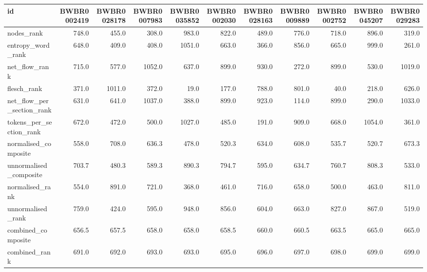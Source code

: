 \begin{tabular}{lrrrrrrrrrr}
\toprule
id & BWBR0002419 & BWBR0028178 & BWBR0007983 & BWBR0035852 & BWBR0002030 & BWBR0028163 & BWBR0009889 & BWBR0002752 & BWBR0045207 & BWBR0029283 \\
\midrule
nodes\_rank & 748.0 & 455.0 & 308.0 & 983.0 & 822.0 & 489.0 & 776.0 & 718.0 & 896.0 & 319.0 \\
\cline{1-11}
entropy\_word\_rank & 648.0 & 409.0 & 408.0 & 1051.0 & 663.0 & 366.0 & 856.0 & 665.0 & 999.0 & 261.0 \\
\cline{1-11}
net\_flow\_rank & 715.0 & 577.0 & 1052.0 & 637.0 & 899.0 & 930.0 & 272.0 & 899.0 & 530.0 & 1019.0 \\
\cline{1-11}
flesch\_rank & 371.0 & 1011.0 & 372.0 & 19.0 & 177.0 & 788.0 & 801.0 & 40.0 & 218.0 & 626.0 \\
\cline{1-11}
net\_flow\_per\_section\_rank & 631.0 & 641.0 & 1037.0 & 388.0 & 899.0 & 923.0 & 114.0 & 899.0 & 290.0 & 1033.0 \\
\cline{1-11}
tokens\_per\_section\_rank & 672.0 & 472.0 & 500.0 & 1027.0 & 485.0 & 191.0 & 909.0 & 668.0 & 1054.0 & 361.0 \\
\cline{1-11}
normalised\_composite & 558.0 & 708.0 & 636.3 & 478.0 & 520.3 & 634.0 & 608.0 & 535.7 & 520.7 & 673.3 \\
\cline{1-11}
unnormalised\_composite & 703.7 & 480.3 & 589.3 & 890.3 & 794.7 & 595.0 & 634.7 & 760.7 & 808.3 & 533.0 \\
\cline{1-11}
normalised\_rank & 554.0 & 891.0 & 721.0 & 368.0 & 461.0 & 716.0 & 658.0 & 500.0 & 463.0 & 811.0 \\
\cline{1-11}
unnormalised\_rank & 759.0 & 424.0 & 595.0 & 948.0 & 856.0 & 604.0 & 663.0 & 827.0 & 867.0 & 519.0 \\
\cline{1-11}
combined\_composite & 656.5 & 657.5 & 658.0 & 658.0 & 658.5 & 660.0 & 660.5 & 663.5 & 665.0 & 665.0 \\
\cline{1-11}
combined\_rank & 691.0 & 692.0 & 693.0 & 693.0 & 695.0 & 696.0 & 697.0 & 698.0 & 699.0 & 699.0 \\
\cline{1-11}
\bottomrule
\end{tabular}
